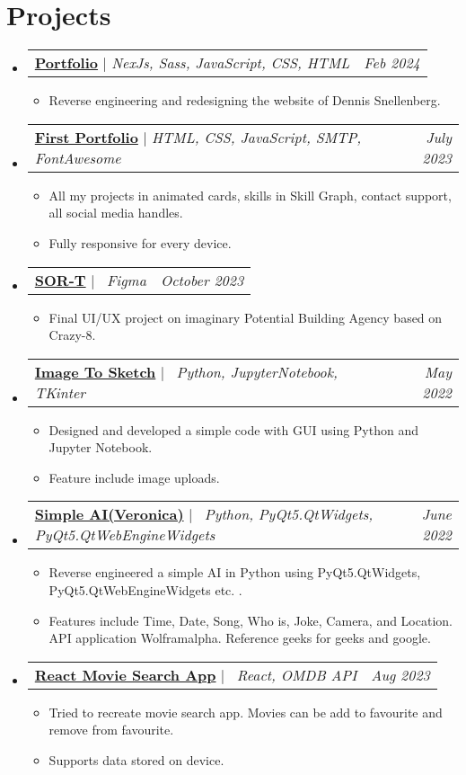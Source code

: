 \documentclass[letterpaper,10pt]{article}
\makeatletter
\newcommand{\subheadingtitlevspace}{
\vspace{-3pt}
}
\newcommand{\resumeItem}[1]{
  \item{
    {#1 \vspace{-4pt}}
  }
}
\newcommand{\titleItem}[1]{
  \textbf{#1}
}
\newcommand{\resumeProjectHeading}[2]{
    \item
    \begin{tabular*}{0.97\textwidth}{l@{\extracolsep{\fill}}r}
      #1 & \textit{ #2} \\
    \end{tabular*}\vspace{-9pt}
}
\newcommand{\resumeSubHeadingListStart}{\subheadingtitlevspace\begin{itemize}[leftmargin=0.15in, label={}]}
\newcommand{\resumeSubHeadingListEnd}{\end{itemize}}
\newcommand{\resumeItemListStart}{
\begin{itemize}}
\newcommand{\resumeItemListEnd}{
\end{itemize}\vspace{-8pt}}
\makeatother
\begin{document}

 \section{Projects}    
     \resumeSubHeadingListStart
        \resumeProjectHeading
           {\titleItem{\href{https://rishilahoti.vercel.app/}{Portfolio}} $|$ \emph{NexJs, Sass, JavaScript, CSS, HTML}}{Feb 2024}
            \resumeItemListStart
            \resumeItem{Reverse engineering and redesigning the website of Dennis Snellenberg. }
           \resumeItemListEnd
       \resumeProjectHeading
           {\titleItem{\href{https://github.com/rishilahoti/Portfolio}{First Portfolio}} $|$ \emph{HTML, CSS, JavaScript, SMTP, FontAwesome}}{July 2023}
            \resumeItemListStart
            \resumeItem{All my projects in animated cards, skills in Skill Graph, contact support, all social media handles. }
            \resumeItem{Fully responsive for every device. }
           \resumeItemListEnd
       \resumeProjectHeading
        {\titleItem{\href{https://www.figma.com/community/file/1302966544079637232/sort-community}{SOR-T}} $|$ \emph{\ Figma}}{October 2023}
            \resumeItemListStart
            \resumeItem{Final UI/UX project on imaginary Potential Building Agency based on Crazy-8. }
           \resumeItemListEnd
        \resumeProjectHeading
         {\titleItem{\href{https://github.com/rishilahoti/Image2Sketch}{Image To Sketch}} $|$ \emph{\ Python, JupyterNotebook, TKinter}}{May 2022}
            \resumeItemListStart
            \resumeItem{Designed and developed a simple code with GUI using Python and Jupyter Notebook. }
            \resumeItem{Feature include image uploads. }
           \resumeItemListEnd
           \resumeProjectHeading
         {\titleItem{\href{https://github.com/rishilahoti/veronica}{Simple AI(Veronica)}} $|$ \emph{\ Python, PyQt5.QtWidgets, PyQt5.QtWebEngineWidgets}}{June 2022}
            \resumeItemListStart
            \resumeItem{Reverse engineered a simple AI in Python using PyQt5.QtWidgets, PyQt5.QtWebEngineWidgets etc. . }
            \resumeItem{Features include Time, Date, Song, Who is, Joke, Camera, and Location. API application Wolframalpha. Reference geeks for geeks and google. }
           \resumeItemListEnd
           \resumeProjectHeading
         {\titleItem{\href{https://github.com/rishilahoti/react-movie-enhanced}{React Movie Search App}} $|$ \emph{\ React, OMDB API}}{Aug 2023}
            \resumeItemListStart
            \resumeItem{Tried to recreate movie search app. Movies can be add to favourite and remove from favourite. }
            \resumeItem{Supports data stored on device. }
           \resumeItemListEnd
     \resumeSubHeadingListEnd
\end{document}
